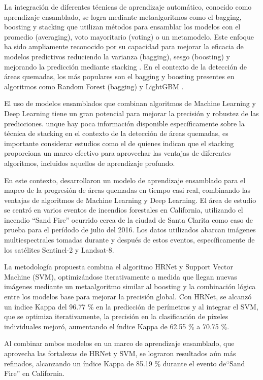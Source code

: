 La integración de diferentes técnicas de aprendizaje automático, conocido como aprendizaje ensamblado, se logra mediante metaalgoritmos como el bagging, boosting y stacking que utilizan métodos para ensamblar los modelos con el 
promedio (averaging), voto mayoritario (voting) o un metamodelo. Este enfoque ha sido ampliamente reconocido por su capacidad para mejorar la eficacia de modelos predictivos reduciendo la varianza (bagging), sesgo (boosting) y mejorando la predicción 
mediante stacking \citep{saini_ensemble_2017}. En el contexto de la detección de áreas quemadas, los más populares son el bagging y boosting presentes en algoritmos como Random Forest (bagging) y 
LightGBM \citep{mienye_survey_2022}.

El uso de modelos ensamblados que combinan algoritmos de Machine Learning y Deep Learning tiene un gran potencial para mejorar la precisión y robustez de las predicciones. unque hay poca información disponible específicamente sobre la técnica de stacking en 
el contexto de la detección de áreas quemadas, es importante considerar estudios como el de \citet{zhang_review_2022} quienes indican que el stacking proporciona un marco efectivo para aprovechar las ventajas de diferentes algoritmos, incluidos aquellos de 
aprendizaje profundo.

En este contexto, \citet{hu_near_2024} desarrollaron un modelo de aprendizaje ensamblado para el mapeo de la progresión de áreas quemadas en tiempo casi real, combinando las ventajas de algoritmos de Machine Learning y Deep
Learning. El área de estudio se centró en varios eventos de incendios forestales en California, utilizando el incendio ``Sand Fire'' ocurrido cerca de la ciudad de Santa Clarita como caso de prueba para el perídodo de julio del 2016. Los 
datos utilizados abarcan imágenes multiespectrales tomadas durante y después de estos eventos, específicamente de los satélites Sentinel-2 y Landsat-8.

La metodología propuesta combina el algoritmo HRNet y Support Vector Machine (SVM), optimizándose iterativamente a medida que llegan nuevas imágenes mediante un metaalgoritmo similar al boosting y la combinación lógica entre los modelos base para 
mejorar la precisión global. Con HRNet, se alcanzó un índice Kappa del 96.77 \% en la predicción de perímetros y al integrar el SVM, que se optimiza iterativamente, la precisión en la clasificación de píxeles individuales mejoró, aumentando el índice Kappa de 62.55 \% 
a 70.75 \%. 

Al combinar ambos modelos en un marco de aprendizaje ensamblado, que aprovecha las fortalezas de HRNet y SVM, se lograron resultados aún más refinados, alcanzando un índice Kappa de 85.19 \% durante el evento de``Sand Fire'' en California.

